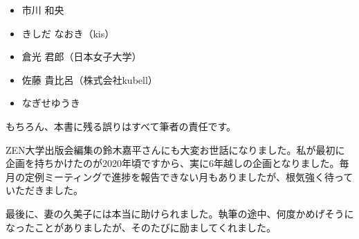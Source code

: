 \begin{itemize}
\tightlist
\item
  市川 和央
\item
  きしだ なおき（kis）
\item
  倉光 君郎（日本女子大学）
\item
  佐藤 貴比呂（株式会社kubell）
\item
  なぎせゆうき
\end{itemize}

もちろん、本書に残る誤りはすべて筆者の責任です。

ZEN大学出版会編集の鈴木嘉平さんにも大変お世話になりました。私が最初に企画を持ちかけたのが2020年頃ですから、実に6年越しの企画となりました。毎月の定例ミーティングで進捗を報告できない月もありましたが、根気強く待っていただきました。

最後に、妻の久美子には本当に助けられました。執筆の途中、何度かめげそうになったことがありましたが、そのたびに励ましてくれました。
